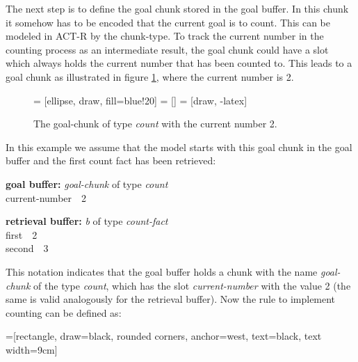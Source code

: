 The next step is to define the goal chunk stored in the goal buffer. In this chunk it somehow has to be encoded that the current goal is to count. This can be modeled in ACT-R by the chunk-type. To track the current number in the counting process as an intermediate result, the goal chunk could have a slot which always holds the current number that has been counted to. This leads to a goal chunk as illustrated in figure \ref{fig:example_counting_goal_chunk}, where the current number is 2.

\begin{figure}[hbt]
\centering
{} = [ellipse, draw, fill=blue!20]
 = [] 
 = [draw, -latex]   

\caption{The goal-chunk of type \emph{count} with the current number 2.}
\label{fig:example_counting_goal_chunk}
\end{figure}


In this example we assume that the model starts with this goal chunk in the goal buffer and the first count fact has been retrieved:

\begin{center}
\parbox{17em}{\textbf{goal buffer:} \emph{goal-chunk} of type \emph{count}\\
\noindent\hspace*{15mm} current-number\ \ 2}

\parbox{17em}{\textbf{retrieval buffer:} \emph{b} of type \emph{count-fact}\\
\noindent\hspace*{15mm} first\ \ 2\\
\noindent\hspace*{15mm} second\ \ 3}
\end{center}

This notation indicates that the goal buffer holds a chunk with the name \emph{goal-chunk} of the type \emph{count}, which has the slot \emph{current-number} with the value 2 (the same is valid analogously for the retrieval buffer). Now the rule to implement counting can be defined as:

=[rectangle, draw=black,  
        rounded corners, anchor=west, text=black, text width=9cm]

